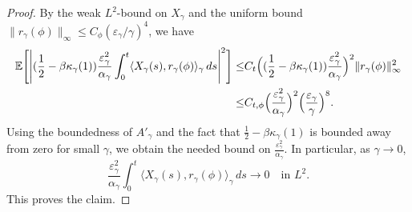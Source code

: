 \documentclass{article}
\begin{document}
\begin{proof}
By the weak \(L^2\)-bound on \(X_\gamma\) and the uniform bound
\(\|r_\gamma(\phi)\|_\infty\le C_\phi(\varepsilon_\gamma/\gamma)^4\), we have
\begin{align*}
\mathbb E\Bigg[
\Bigg|
(\frac12-\beta\kappa_\gamma(1))\frac{\varepsilon_\gamma^2}{\alpha_\gamma}
\int_0^t
\langle X_\gamma(s),r_\gamma(\phi)\rangle_\gamma\,ds
\Bigg|^2
\Bigg]
\le &
C_t
\Bigl((\frac12-\beta\kappa_\gamma(1))\frac{\varepsilon_\gamma^2}{\alpha_\gamma}\Bigr)^2
\|r_\gamma(\phi)\|_\infty^2  \\
\le &
C_{t,\phi}
\Bigl(\frac{\varepsilon_\gamma^2}{\alpha_\gamma}\Bigr)^2\Bigl(\frac{\varepsilon_\gamma}{\gamma}\Bigr)^8 .
\end{align*}
Using the boundedness of \(A'_\gamma\) and the fact that
\(\frac12-\beta\kappa_\gamma(1)\) is bounded away from zero for small \(\gamma\), we obtain the needed bound on \(\frac{\varepsilon_\gamma^2}{\alpha_\gamma}\). In particular, as $\gamma \to 0$,
\[
 \frac{\varepsilon_\gamma^2}{\alpha_\gamma}
\int_0^t
\langle X_\gamma(s),r_\gamma(\phi)\rangle_\gamma\,ds
\rightarrow 0
\quad\text{in } L^2.
\]
This proves the claim.
\end{proof}
\end{document}
